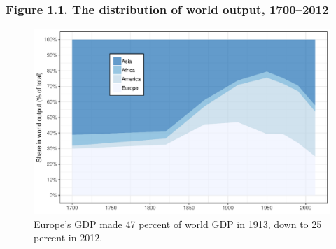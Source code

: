 \documentclass[t]{beamer}\usepackage[]{graphicx}\usepackage[]{color}
\newenvironment{knitrout}{}{} %
\begin{document}
\begin{frame}[label=Figure_1_1b]
\frametitle{Figure 1.1. The distribution of world output, 1700--2012}
\begin{figure}[t]
\begin{minipage}[b]{\textwidth}
\centering
\begin{knitrout}\footnotesize
{}\color{fgcolor}

{\centering \includegraphics[width=1\linewidth]{figures/color/Figure_1_1b} 

}



\end{knitrout}
\caption{Europe's GDP made 47 percent of world GDP in 1913, down to 25 percent in 2012.}
\end{minipage}
\end{figure}
\end{frame}
\end{document}
